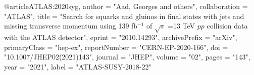 @article{ATLAS:2020syg,
    author = "Aad, Georges and others",
    collaboration = "ATLAS",
    title = "{Search for squarks and gluinos in final states with jets and missing transverse momentum using 139 fb$^{-1}$ of $\sqrt{s}$ =13 TeV $pp$ collision data with the ATLAS detector}",
    eprint = "2010.14293",
    archivePrefix = "arXiv",
    primaryClass = "hep-ex",
    reportNumber = "CERN-EP-2020-166",
    doi = "10.1007/JHEP02(2021)143",
    journal = "JHEP",
    volume = "02",
    pages = "143",
    year = "2021",
    label = "ATLAS-SUSY-2018-22"
}

